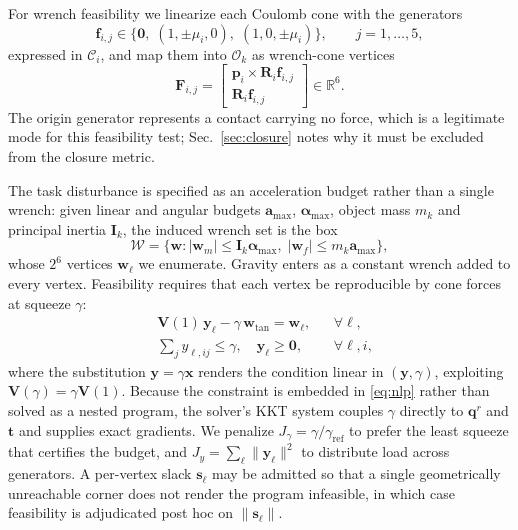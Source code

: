 For wrench feasibility we linearize each Coulomb cone with the generators
%
\begin{equation}
  \bm{f}_{i,j} \in \bigl\{ \bm{0},\;
    (1, \pm\mu_i, 0),\; (1, 0, \pm\mu_i) \bigr\},
  \qquad j = 1,\dots,5,
\end{equation}
%
expressed in $\mathcal{C}_i$, and map them into $\mathcal{O}_k$ as wrench-cone
vertices
%
\begin{equation}
  \bm{F}_{i,j} =
  \begin{bmatrix} \bm{p}_i \times \bm{R}_i \bm{f}_{i,j} \\ \bm{R}_i \bm{f}_{i,j} \end{bmatrix}
  \in \mathbb{R}^6 .
\end{equation}
%
The origin generator represents a contact carrying no force, which is a legitimate
mode for this feasibility test; Sec.~\ref{sec:closure} notes why it must be excluded
from the closure metric.

The task disturbance is specified as an acceleration budget rather than a single
wrench: given linear and angular budgets $\bm{a}_{\max}$, $\bm{\alpha}_{\max}$,
object mass $m_k$ and principal inertia $\bm{I}_k$, the induced wrench set is the
box
%
\begin{equation}
  \mathcal{W} = \bigl\{ \bm{w} : \lvert \bm{w}_{m} \rvert \le \bm{I}_k \bm{\alpha}_{\max},\;
                   \lvert \bm{w}_{f} \rvert \le m_k \bm{a}_{\max} \bigr\},
  \label{eq:budget}
\end{equation}
%
whose $2^6$ vertices $\bm{w}_\ell$ we enumerate. Gravity enters as a constant
wrench added to every vertex. Feasibility requires that each vertex be
reproducible by cone forces at squeeze $\gamma$:
%
\begin{equation}
\begin{aligned}
  & \bm{V}(1)\, \bm{y}_\ell - \gamma\, \bm{w}_{\mathrm{tan}} = \bm{w}_\ell,
    && \forall \ell, \\
  & \textstyle\sum_{j} y_{\ell,ij} \le \gamma, \quad \bm{y}_\ell \ge \bm{0},
    && \forall \ell, i,
\end{aligned}
\label{eq:wrench-lp}
\end{equation}
%
where the substitution $\bm{y} = \gamma \bm{x}$ renders the condition linear in
$(\bm{y}, \gamma)$, exploiting $\bm{V}(\gamma) = \gamma \bm{V}(1)$. Because the
constraint is embedded in \eqref{eq:nlp} rather than solved as a nested program,
the solver's KKT system couples $\gamma$ directly to $\bm{q}^r$ and $\bm{t}$ and
supplies exact gradients. We penalize $J_\gamma = \gamma / \gamma_{\mathrm{ref}}$
to prefer the least squeeze that certifies the budget, and
$J_y = \sum_\ell \lVert \bm{y}_\ell \rVert^2$ to distribute load across
generators. A per-vertex slack $\bm{s}_\ell$ may be admitted so that a single
geometrically unreachable corner does not render the program infeasible, in
which case feasibility is adjudicated post hoc on $\lVert \bm{s}_\ell \rVert$.

